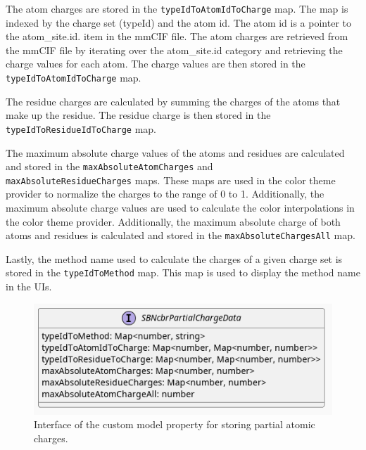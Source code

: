 \documentclass[
  digital,     %
  oneside,     %
  nosansbold,  %
  nocolorbold, %
  lof,         %
  lot,         %
]{fithesis4}
\begin{document}
The atom charges are stored in the \texttt{typeIdToAtomIdToCharge} map. The map is indexed by the charge set (typeId) and the atom id. The atom id is a pointer to the atom\_site.id. item in the mmCIF file. The atom charges are retrieved from the mmCIF file by iterating over the atom\_site.id category and retrieving the charge values for each atom. The charge values are then stored in the \texttt{typeIdToAtomIdToCharge} map.

The residue charges are calculated by summing the charges of the atoms that make up the residue. The residue charge is then stored in the \texttt{typeIdToResidueIdToCharge} map.

The maximum absolute charge values of the atoms and residues are calculated and stored in the \texttt{maxAbsoluteAtomCharges} and \\
\texttt{maxAbsoluteResidueCharges} maps. These maps are used in the color theme provider to normalize the charges to the range of 0 to 1. Additionally, the maximum absolute charge values are used to calculate the color interpolations in the color theme provider. Additionally, the maximum absolute charge of both atoms and residues is calculated and stored in the \texttt{maxAbsoluteChargesAll} map.

Lastly, the method name used to calculate the charges of a given charge set is stored in the \texttt{typeIdToMethod} map. This map is used to display the method name in the UIs.

\begin{figure}[htbp]
  \begin{center}
    \includegraphics[width=\textwidth]{out/figures/uml/interface/custom model property interface.png}
  \end{center}
  \caption{Interface of the custom model property for storing partial atomic charges.}
  \label{fig:property_provider_interface}
\end{figure}
\end{document}
